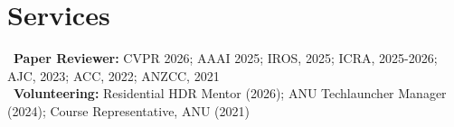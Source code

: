 \section*{Services}
\textbullet~\textbf{Paper Reviewer:} CVPR 2026; AAAI 2025; IROS, 2025; ICRA, 2025-2026; AJC, 2023; ACC, 2022; ANZCC, 2021\\[0.5em]
\textbullet~\textbf{Volunteering:} Residential HDR Mentor (2026); ANU Techlauncher Manager (2024); Course Representative, ANU (2021)